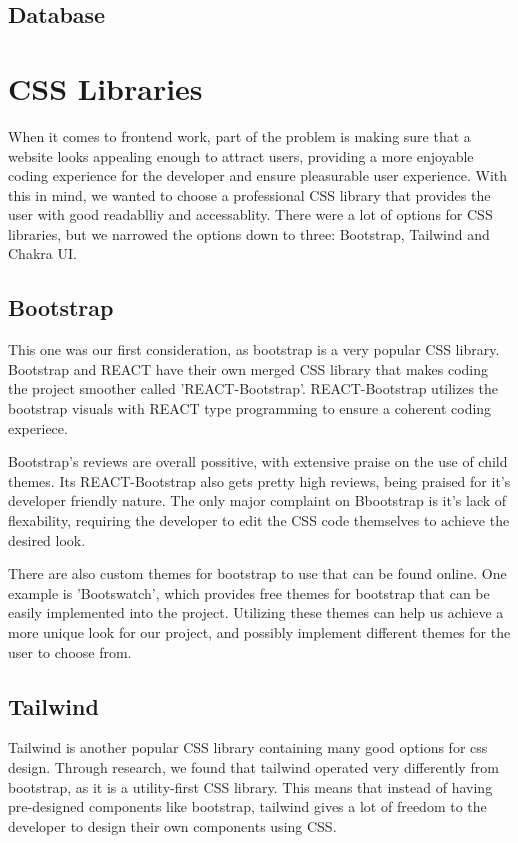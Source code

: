\documentclass[12pt]{article}
\begin{document}
\subsection{Database}

\section{CSS Libraries}

When it comes to frontend work, part of the problem is making sure that a website looks appealing enough to attract users, providing a more enjoyable coding experience for the developer and ensure pleasurable user experience. %
With this in mind, we wanted to choose a professional CSS library that provides the user with good readablliy and accessablity.
There were a lot of options for CSS libraries, but we narrowed the options down to three: Bootstrap, Tailwind and Chakra UI.

\subsection{Bootstrap} 
This one was our first consideration, as bootstrap is a very popular CSS library. 
Bootstrap and REACT have their own merged CSS library that makes coding the project smoother called 'REACT-Bootstrap'.
REACT-Bootstrap utilizes the bootstrap visuals with REACT type programming to ensure a coherent coding experiece.

Bootstrap's reviews are overall possitive, with extensive praise on the use of child themes.
Its REACT-Bootstrap also gets pretty high reviews, being praised for it's developer friendly nature.
The only major complaint on Bbootstrap is it's lack of flexability, requiring the developer to edit the CSS code themselves to achieve the desired look.

There are also custom themes for bootstrap to use that can be found online.
One example is 'Bootswatch', which provides free themes for bootstrap that can be easily implemented into the project.
Utilizing these themes can help us achieve a more unique look for our project, and possibly implement different themes for the user to choose from.


\subsection{Tailwind}
Tailwind is another popular CSS library containing many good options for css design.
Through research, we found that tailwind operated very differently from bootstrap, as it is a utility-first CSS library.
This means that instead of having pre-designed components like bootstrap, tailwind gives a lot of freedom to the developer to design their own components using CSS.
\end{document}
